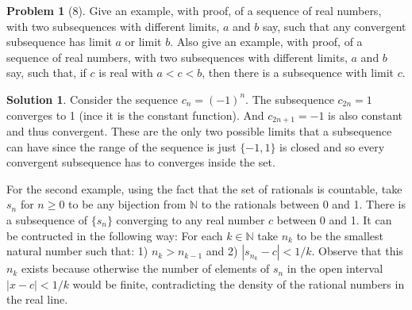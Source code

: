 \documentclass{article}
\theoremstyle{definition}
\newtheorem*{soln}{Solution}
\newtheorem*{prob}{Problem}
\theoremstyle{theorem}
\newcommand{\N}{\mathbb{N}}
\begin{document}
\begin{prob}[8]
Give an example, with proof, of a sequence of real numbers, with two subsequences with different limits, $a$ and $b$ say, such that any convergent subsequence has limit $a$ or limit $b$.    Also give an example, with proof, of a sequence of real numbers, with two subsequences with different limits, $a$ and $b$ say, such that, if $c$ is real with $a < c< b$, then there is a  subsequence with limit $c$. 
\end{prob}
\begin{soln}
    Consider the sequence $c_n = (-1)^n$. The subsequence $c_{2n } = 1$ converges to 1 (ince it is the constant function). And $c_{2n+1 } = -1$ is also constant and thus convergent. These are the only two possible limits that a subsequence can have since the range of the sequence is just $\{-1,1  \}$ is closed and so every convergent subsequence has to converges inside the set. 

    For the second example, using the fact that the set of rationals is countable, take $s_n$ for $n\geq 0$ to be any bijection from $\N$ to the rationals between 0 and 1.  There is a subsequence of $\{s_n  \}$ converging to any real number $c$ between 0 and 1. It can be contructed in the following way: For each $k\in \N$ take $n_k$ to be the smallest natural number such that: 1) $n_k>n_{k-1 }$ and  2) $|s_{n_k }-c|<1/k$. Observe that this $n_k$ exists because otherwise the number of elements of $s_n$ in the open interval $|x-c|<1/k$ would be finite, contradicting the density of the rational numbers in the real line.
\end{soln}
\vspace{1in}
\end{document}
